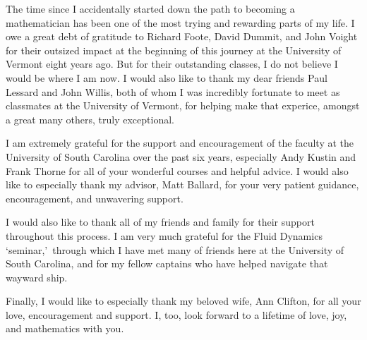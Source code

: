 The time since I accidentally started down the path to becoming a mathematician has been one of the most trying and rewarding parts of my life.
I owe a great debt of gratitude to Richard Foote, David Dummit, and John Voight for their outsized impact at the beginning of this journey at the University of Vermont eight years ago.
But for their outstanding classes, I do not believe I would be where I am now.
I would also like to thank my dear friends Paul Lessard and John Willis, both of whom I was incredibly fortunate to meet as classmates at the University of Vermont, for helping make that experice, amongst a great many others, truly exceptional.

I am extremely grateful for the support and encouragement of the faculty at the University of South Carolina over the past six years, especially Andy Kustin and Frank Thorne for all of your wonderful courses and helpful advice.
I would also like to especially thank my advisor, Matt Ballard, for your very patient guidance, encouragement, and unwavering support.

I would also like to thank all of my friends and family for their support throughout this process.
I am very much grateful for the Fluid Dynamics \lq seminar,\rq\, through which I have met many of friends here at the University of South Carolina, and for my fellow captains who have helped navigate that wayward ship.

Finally, I would like to especially thank my beloved wife, Ann Clifton, for all your love, encouragement and support.
I, too, look forward to a lifetime of love, joy, and mathematics with you.
